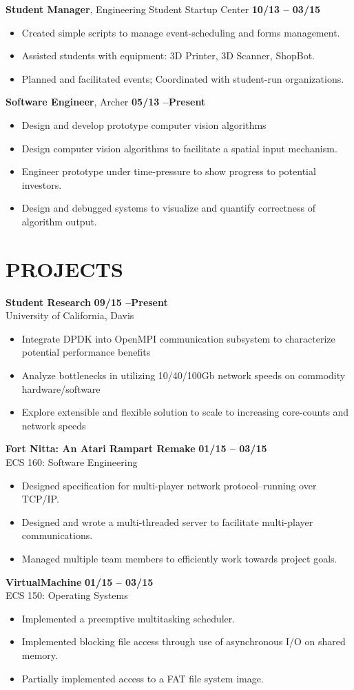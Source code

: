 \documentclass[10pt, letterpaper]{res}
\newcommand{\experience}[4]{
	{\bf #1}, #2 \hfill {\bf #3}
	\begin{itemize}[noitemsep]
		#4
    \end{itemize}
}
\newcommand{\project}[4]{
	{\bf #1} \hfill {\bf #3} \vspace{-1mm} \\
	{\footnotesize #2}
	\begin{itemize}[noitemsep]
		#4
    \end{itemize}
}
\begin{document}
\begin{resume}
	\experience{Student Manager}{Engineering Student Startup Center}{10/13 -- 03/15}{
		\item Created simple scripts to manage event-scheduling and forms management.
		\item Assisted students with equipment: 3D Printer, 3D Scanner, ShopBot.
		\item Planned and facilitated events; Coordinated with student-run organizations.
    }

	\experience{Software Engineer}{Archer}{05/13 --\footnotesize Present}{
		\item Design and develop prototype computer vision algorithms
		\item Design computer vision algorithms to facilitate a spatial input mechanism.
		\item Engineer prototype under time-pressure to show progress to potential investors.
		\item Design and debugged systems to visualize and quantify correctness of algorithm output.
	}

\section{PROJECTS}
    \project{Student Research}{University of California, Davis}{09/15 --\footnotesize Present}{
		\item Integrate DPDK into OpenMPI communication subsystem to characterize potential performance benefits
        \item Analyze bottlenecks in utilizing 10/40/100Gb network speeds on commodity hardware/software
        \item Explore extensible and flexible solution to scale to increasing core-counts and network speeds
	}

	\project{Fort Nitta: An Atari Rampart Remake}{ECS 160: Software Engineering}{01/15 -- 03/15}{
        \item Designed specification for multi-player network protocol--running over TCP/IP.
        \item Designed and wrote a multi-threaded server to facilitate multi-player communications.
        \item Managed multiple team members to efficiently work towards project goals.
    }

    \project{VirtualMachine}{ECS 150: Operating Systems}{01/15 -- 03/15}{
        \item Implemented a preemptive multitasking scheduler.
        \item Implemented blocking file access through use of asynchronous I/O on shared memory.
        \item Partially implemented access to a FAT file system image.
	}


\end{resume}
\end{document}
